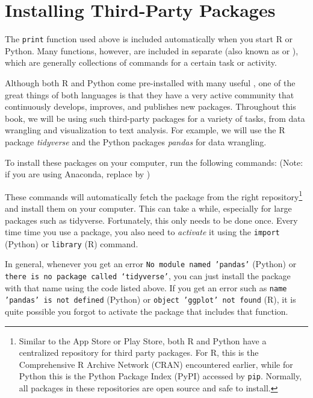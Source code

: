 \section{Installing Third-Party Packages}
\label{sec:installingpackages}

The \texttt{print} function used above is included automatically when you start R or Python.
Many functions, however, are included in separate  (also known as  or ), which are
generally collections of commands for a certain task or activity.

Although both R and Python come pre-installed with many useful ,
one of the great things of both languages is that they have a very active community that continuously develops, improves, and publishes new packages.
Throughout this book, we will be using such third-party packages for a variety of tasks, from data wrangling and visualization to text analysis.
For example, we will use the R package \emph{tidyverse} and the Python packages \emph{pandas} for data wrangling.

To install these packages on your computer, run the following commands:
(Note: if you are using Anaconda, replace  by )  

\begin{tcbraster}[raster columns=2,raster equal height=rows,raster valign=top]
\end{tcbraster}


These commands will automatically fetch the package from the right repository\footnote{Similar to the App Store or Play Store, both R and Python have a centralized repository for third party packages.  For R, this is the Comprehensive R Archive Network (CRAN) encountered earlier,
    while for Python this is the Python Package Index (PyPI) accessed by \verb|pip|.  Normally, all packages in these repositories are open source and safe to install.} and install them on your computer. This can take a while, especially for large packages such as tidyverse.
Fortunately, this only needs to be done once.
Every time time you use a package, you also need to \emph{activate} it using the \texttt{import} (Python) or  \texttt{library} (R) command.

In general, whenever you get an error \texttt{No module named 'pandas'} (Python) or \texttt{there is no package called ‘tidyverse’},
you can just install the package with that name using the code listed above.
If you get an error such as \texttt{name 'pandas' is not defined} (Python) or \texttt{object 'ggplot' not found} (R),
it is quite possible you forgot to activate the package that includes that function. 


